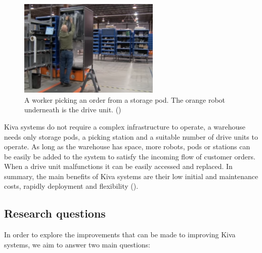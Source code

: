 \documentclass[a4paper,11pt]{article}
\begin{document}
\begin{figure}[h!]
	\centering
	\includegraphics[width=0.6\textwidth ]{graphics/kivaprocess}
	\caption{A worker picking an order from a storage pod. The orange robot underneath is the drive unit. (\cite{kivayoutube2010quietlogistics})}
	\label{kivaprocess}
\end{figure}


Kiva systems do not require a complex infrastructure to operate, a warehouse needs only storage pods, a picking station and a suitable number of drive units to operate. As long as the warehouse has space, more robots, pods or stations can be easily be added to the system to satisfy the incoming flow of customer orders. When a drive unit malfunctions it can be easily accessed and replaced. In summary, the main benefits of Kiva systems are their low initial and maintenance costs, rapidly deployment and flexibility (\cite{wurman2008coordinating}).

\subsection{Research questions}
In order to explore the improvements that can be made to improving Kiva systems, we aim to answer two main questions:
\end{document}
